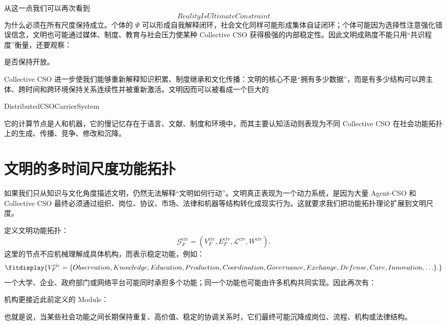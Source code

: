从这一点我们可以再次看到
\[
RealityIsUltimateConstraint
\]
为什么必须在所有尺度保持成立。个体的 $\Psi$ 可以形成自我解释闭环，社会文化同样可能形成集体自证闭环；个体可能因为选择性注意强化错误信念，文明也可能通过媒体、制度、教育与社会压力使某种 Collective CSO 获得极强的内部稳定性。因此文明成熟度不能只用“共识程度”衡量，还要观察：
\begin{statementbox}
\centering
{}
\end{statementbox}
是否保持开放。

Collective CSO 进一步使我们能够重新解释知识积累、制度继承和文化传播：文明的核心不是“拥有多少数据”，而是有多少结构可以跨主体、跨时间和跨环境保持关系连续性并被重新激活。文明因而可以被看成一个巨大的
\begin{statementbox}
DistributedCSOCarrierSystem
\end{statementbox}
它的计算节点是人和机器，它的慢记忆存在于语言、文献、制度和环境中，而其主要认知活动则表现为不同 Collective CSO 在社会功能拓扑上的生成、传播、竞争、修改和沉降。

\section{文明的多时间尺度功能拓扑}

如果我们只从知识与文化角度描述文明，仍然无法解释“文明如何行动”。文明真正表现为一个动力系统，是因为大量 Agent-CSO 和 Collective CSO 最终必须通过组织、岗位、协议、市场、法律和机器等结构转化成现实行为。这就要求我们把功能拓扑理论扩展到文明尺度。

定义文明功能拓扑：
\[
\mathcal G_F^{\mathrm{civ}}
=
\left(
V_F^{\mathrm{civ}},
E_F^{\mathrm{civ}},
\mathcal L^{\mathrm{civ}},
W^{\mathrm{civ}}
\right).
\]
这里的节点不应机械理解成具体机构，而表示稳定功能，例如：
\[
\fitdisplay{
V_F^{\mathrm{civ}}
=
\{
Observation,
Knowledge,
Education,
Production,
Coordination,
Governance,
Exchange,
Defense,
Care,
Innovation,\ldots
\}.
}
\]
一个大学、企业、政府部门或网络平台可能同时承担多个功能；同一个功能也可能由许多机构共同实现。因此再次有：
\begin{statementbox}
\centering
{}
\end{statementbox}
机构更接近此前定义的 Module：
\begin{statementbox}
\centering
{}
\end{statementbox}
也就是说，当某些社会功能之间长期保持重复、高价值、稳定的协调关系时，它们最终可能沉降成岗位、流程、机构或法律结构。

